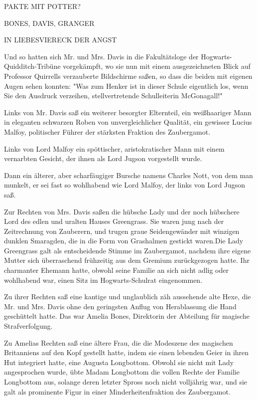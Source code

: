 {PAKTE MIT POTTER?

BONES, DAVIS, GRANGER

IN LIEBESVIERECK DER ANGST

Und so hatten sich Mr. und Mrs. Davis in die Fakultätsloge der Hogwarts-Quidditch-Tribüne vorgekämpft, wo sie nun mit einem ausgezeichneten Blick auf Professor Quirrells verzauberte Bildschirme saßen, so dass die beiden mit eigenen Augen sehen konnten: "Was zum Henker ist in dieser Schule eigentlich los, wenn Sie den Ausdruck verzeihen, stellvertretende Schulleiterin McGonagall!"

Links von Mr. Davis saß ein weiterer besorgter Elternteil, ein weißhaariger Mann in eleganten schwarzen Roben von unvergleichlicher Qualität, ein gewisser Lucius Malfoy, politischer Führer der stärksten Fraktion des Zaubergamot.

Links von Lord Malfoy ein spöttischer, aristokratischer Mann mit einem vernarbten Gesicht, der ihnen als Lord Jugson vorgestellt wurde.

Dann ein älterer, aber scharfäugiger Bursche namens Charles Nott, von dem man munkelt, er sei fast so wohlhabend wie Lord Malfoy, der links von Lord Jugson saß.

Zur Rechten von Mrs. Davis saßen die hübsche Lady und der noch hübschere Lord des edlen und uralten Hauses Greengrass. Sie waren jung nach der Zeitrechnung von Zauberern, und trugen graue Seidengewänder mit winzigen dunklen Smaragden, die in die Form von Grashalmen gestickt waren.Die Lady Greengrass galt als entscheidende Stimme im Zaubergamot, nachdem ihre eigene Mutter sich überraschend frühzeitig aus dem Gremium zurückgezogen hatte. Ihr charmanter Ehemann hatte, obwohl seine Familie an sich nicht adlig oder wohlhabend war, einen Sitz im Hogwarts-Schulrat eingenommen.

Zu ihrer Rechten saß eine kantige und unglaublich zäh aussehende alte Hexe, die Mr. und Mrs. Davis ohne den geringsten Anflug von Herablassung die Hand geschüttelt hatte. Das war Amelia Bones, Direktorin der Abteilung für magische Strafverfolgung.

Zu Amelias Rechten saß eine ältere Frau, die die Modeszene des magischen Britanniens auf den Kopf gestellt hatte, indem sie einen lebenden Geier in ihren Hut integriert hatte, eine Augusta Longbottom. Obwohl sie nicht mit Lady angesprochen wurde, übte Madam Longbottom die vollen Rechte der Familie Longbottom aus, solange deren letzter Spross noch nicht volljährig war, und sie galt als prominente Figur in einer Minderheitenfraktion des Zaubergamot.

}
